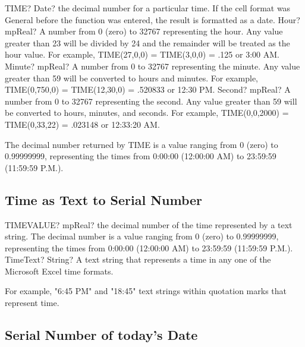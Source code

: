 \begin{mpFunctionsExtract}
	\mpWorksheetFunctionThreeNotImplemented
	{TIME? Date? the decimal number for a particular time. If the cell format was General before the function was entered, the result is formatted as a date.}
	{Hour? mpReal? A number from 0 (zero) to 32767 representing the hour. Any value greater than 23 will be divided by 24 and the remainder will be treated as the hour value. For example, TIME(27,0,0) = TIME(3,0,0) = .125 or 3:00 AM.}
	{Minute? mpReal? A number from 0 to 32767 representing the minute. Any value greater than 59 will be converted to hours and minutes. For example, TIME(0,750,0) = TIME(12,30,0) = .520833 or 12:30 PM.}
	{Second? mpReal? A number from 0 to 32767 representing the second. Any value greater than 59 will be converted to hours, minutes, and seconds. For example, TIME(0,0,2000) = TIME(0,33,22) = .023148 or 12:33:20 AM.}
\end{mpFunctionsExtract}

\vspace{0.3cm}
The decimal number returned by TIME is a value ranging from 0 (zero) to 0.99999999, representing the times from 0:00:00 (12:00:00 AM) to 23:59:59 (11:59:59 P.M.).






\subsection{Time as Text to Serial Number}

\begin{mpFunctionsExtract}
	\mpWorksheetFunctionOneNotImplemented
	{TIMEVALUE? mpReal? the decimal number of the time represented by a text string. The decimal number is a value ranging from 0 (zero) to 0.99999999, representing the times from 0:00:00 (12:00:00 AM) to 23:59:59 (11:59:59 P.M.).}
	{TimeText? String? A text string that represents a time in any one of the Microsoft Excel time formats.}
\end{mpFunctionsExtract}

\vspace{0.3cm}

For example, "6:45 PM" and "18:45" text strings within quotation marks that represent time.




\subsection{Serial Number of today's Date}

